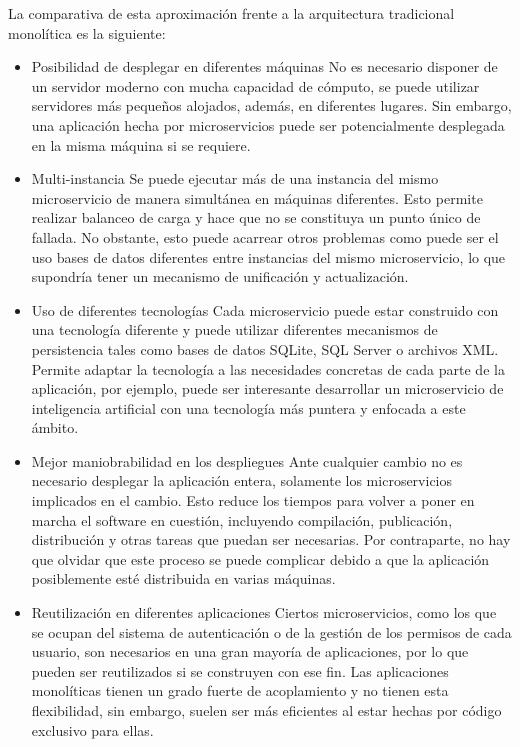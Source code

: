 \documentclass[11pt,spanish,listoffigures]{tfgetsinf}
\begin{document}
La comparativa de esta aproximación frente a la arquitectura tradicional monolítica es la siguiente:

\begin{itemize}

	\item Posibilidad de desplegar en diferentes máquinas
No es necesario disponer de un servidor moderno con mucha capacidad de cómputo, se puede utilizar servidores más pequeños alojados, además, en diferentes lugares. Sin embargo, una aplicación hecha por microservicios puede ser potencialmente desplegada en la misma máquina si se requiere.

	\item Multi-instancia
Se puede ejecutar más de una instancia del mismo microservicio de manera simultánea en máquinas diferentes. Esto permite realizar balanceo de carga y hace que no se constituya un punto único de fallada. No obstante, esto puede acarrear otros problemas como puede ser el uso bases de datos diferentes entre instancias del mismo microservicio, lo que supondría tener un mecanismo de unificación y actualización.

	\item Uso de diferentes tecnologías
Cada microservicio puede estar construido con una tecnología diferente y puede utilizar diferentes mecanismos de persistencia tales como bases de datos SQLite, SQL Server o archivos XML. Permite adaptar la tecnología a las necesidades concretas de cada parte de la aplicación, por ejemplo, puede ser interesante desarrollar un microservicio de inteligencia artificial con una tecnología más puntera y enfocada a este ámbito.

	\item Mejor maniobrabilidad en los despliegues
Ante cualquier cambio no es necesario desplegar la aplicación entera, solamente los microservicios implicados en el cambio. Esto reduce los tiempos para volver a poner en marcha el software en cuestión, incluyendo compilación, publicación, distribución y otras tareas que puedan ser necesarias. Por contraparte, no hay que olvidar que este proceso se puede complicar debido a que la aplicación posiblemente esté distribuida en varias máquinas.

	\item Reutilización en diferentes aplicaciones
Ciertos microservicios, como los que se ocupan del sistema de autenticación o de la gestión de los permisos de cada usuario, son necesarios en una gran mayoría de aplicaciones, por lo que pueden ser reutilizados si se construyen con ese fin. Las aplicaciones monolíticas tienen un grado fuerte de acoplamiento y no tienen esta flexibilidad, sin embargo, suelen ser más eficientes al estar hechas por código exclusivo para ellas.


\end{itemize}
\end{document}
